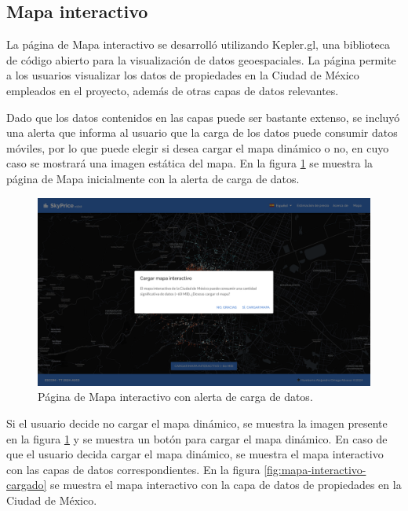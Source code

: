 \subsection{Mapa interactivo}
La página de Mapa interactivo se desarrolló utilizando Kepler.gl, una biblioteca
de código abierto para la visualización de datos geoespaciales. La página permite
a los usuarios visualizar los datos de propiedades en la Ciudad de México empleados
en el proyecto, además de otras capas de datos relevantes.

Dado que los datos contenidos en las capas puede ser bastante extenso, se incluyó
una alerta que informa al usuario que la carga de los datos puede consumir
datos móviles, por lo que puede elegir si desea cargar el mapa dinámico o no,
en cuyo caso se mostrará una imagen estática del mapa. En la figura
\ref{fig:mapa-interactivo} se muestra la página de Mapa inicialmente con la alerta
de carga de datos.

\begin{figure}[H]
    \centering
    \includegraphics[width=1.0\textwidth]{imagenes/05-implementacion/interfaz-grafica/mapa-interactivo-prompt.png}
    \caption{Página de Mapa interactivo con alerta de carga de datos.}
    \label{fig:mapa-interactivo}
\end{figure}

Si el usuario decide no cargar el mapa dinámico, se muestra la imagen presente en
la figura \ref{fig:mapa-interactivo} y se muestra un botón para cargar el mapa
dinámico. En caso de que el usuario decida cargar el mapa dinámico, se muestra el
mapa interactivo con las capas de datos correspondientes. En la figura
\ref{fig:mapa-interactivo-cargado} se muestra el mapa interactivo con la capa
de datos de propiedades en la Ciudad de México.


